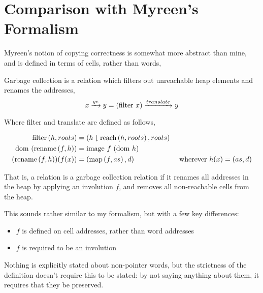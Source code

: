 \section{Comparison with Myreen's Formalism}
\label{sec:copying-myreen}

Myreen's\cite{Myreen10} notion of copying correctness is somewhat more
abstract than mine, and is defined in terms of cells, rather than
words,

\begin{definition}
  \label{def:c-myreen-correctness}
  Garbage collection is a relation which filters out unreachable heap
  elements and renames the addresses, \[x \gc y = (\mathrm{filter}~x)
  \translate y\]

  Where filter and translate are defined as follows,

  \begin{prooftree}
  \end{prooftree}

  \begin{align*}
    \filter{h}{roots} &= (h \restrict \reach{h}{roots}, roots)\\
    \dom~(\rename{f}{h}) &= \mathrm{image}~f~(\dom~h)\\
    (\rename{f}{h})(f(x)) &= (\map{f}{as}, d) & \mbox{ wherever } h(x)
    = (as, d)\\
  \end{align*}
\end{definition}

That is, a relation is a garbage collection relation if it renames all
addresses in the heap by applying an involution $f$, and removes all
non-reachable cells from the heap.

This sounds rather similar to my formalism, but with a few key
differences:

\begin{itemize}
\item $f$ is defined on cell addresses, rather than word addresses
\item $f$ is required to be an involution
\end{itemize}

Nothing is explicitly stated about non-pointer words, but the
strictness of the definition doesn't require this to be stated: by not
saying anything about them, it requires that they be preserved.

